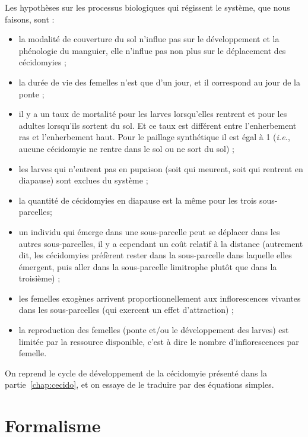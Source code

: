 Les hypothèses sur les processus biologiques qui régissent le système, que nous faisons, sont :
\begin{itemize}
 \item la modalité de couverture du sol n'influe pas sur le développement et la phénologie du manguier, elle n'influe pas non plus sur le déplacement des cécidomyies ;
 \item la durée de vie des femelles n'est que d'un jour, et il correspond au jour de la ponte ;
 \item il y a un taux de mortalité pour les larves lorsqu'elles rentrent et pour les adultes lorsqu'ils sortent du sol. Et ce taux est différent entre l'enherbement ras et l'enherbement haut. Pour le paillage synthétique il est égal à 1 (\textit{i.e.}, aucune cécidomyie ne rentre dans le sol ou ne sort du sol) ;
 \item les larves qui n'entrent pas en pupaison (soit qui meurent, soit qui rentrent en diapause) sont exclues du système ;
 \item la quantité de cécidomyies en diapause est la même pour les trois sous-parcelles;
 \item un individu qui émerge dans une sous-parcelle peut se déplacer dans les autres sous-parcelles, il y a cependant un coût relatif à la distance (autrement dit, les cécidomyies préfèrent rester dans la sous-parcelle dans laquelle elles émergent, puis aller dans la sous-parcelle limitrophe plutôt que dans la troisième) ;
 \item les femelles exogènes arrivent proportionnellement aux inflorescences vivantes dans les sous-parcelles (qui exercent un effet d'attraction) ;
 \item la reproduction des femelles (ponte et/ou le développement des larves) est limitée par la ressource disponible, c'est à dire le nombre d'inflorescences par femelle.
\end{itemize}

On reprend le cycle de développement de la cécidomyie présenté dans la partie~\ref{chap:cecido}, et on essaye de le traduire par des équations simples.

\section{Formalisme}

